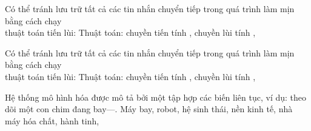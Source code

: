 \documentclass{article}
\begin{document}
\begin{huge}
\vspace{0.2in}

\textwidth
{}


Có thể tránh lưu trữ tất cả các tin nhắn chuyển tiếp trong quá trình làm mịn bằng cách chạy \\
thuật toán tiến lùi:
Thuật toán: chuyền tiến tính , chuyền lùi tính , 

\vspace{0.2in}

\textwidth
{}


Có thể tránh lưu trữ tất cả các tin nhắn chuyển tiếp trong quá trình làm mịn bằng cách chạy \\
thuật toán tiến lùi:
Thuật toán: chuyền tiến tính , chuyền lùi tính , 

\vspace{0.2in}

\textwidth
{}






Hệ thống mô hình hóa được mô tả bởi một tập hợp các biến liên tục,\al
ví dụ: theo dõi một con chim đang bay---.\al
Máy bay, robot, hệ sinh thái, nền kinh tế, nhà máy hóa chất, hành tinh, \mat{$\ldots$}


\end{huge}
\end{document}
